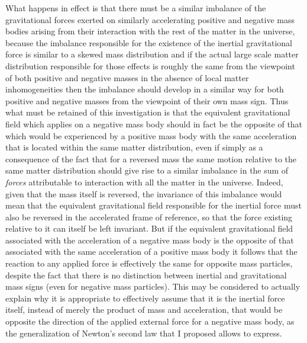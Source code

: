 \documentclass[notitlepage,12pt]{report}
\begin{document}
What happens in effect is that there must be a similar imbalance of the gravitational forces exerted on similarly accelerating positive and negative mass bodies arising from their interaction with the rest of the matter in the universe, because the imbalance responsible for the existence of the inertial gravitational force is similar to a skewed mass distribution and if the actual large scale matter distribution responsible for those effects is roughly the same from the viewpoint of both positive and negative masses in the absence of local matter inhomogeneities then the imbalance should develop in a similar way for both positive and negative masses from the viewpoint of their own mass sign. Thus what must be retained of this investigation is that the equivalent gravitational field which applies on a negative mass body should in fact be the opposite of that which would be experienced by a positive mass body with the same acceleration that is located within the same matter distribution, even if simply as a consequence of the fact that for a reversed mass the same motion relative to the same matter distribution should give rise to a similar imbalance in the sum of \textit{forces} attributable to interaction with all the matter in the universe. Indeed, given that the mass itself is reversed, the invariance of this imbalance would mean that the equivalent gravitational field responsible for the inertial force must also be reversed in the accelerated frame of reference, so that the force existing relative to it can itself be left invariant. But if the equivalent gravitational field associated with the acceleration of a negative mass body is the opposite of that associated with the same acceleration of a positive mass body it follows that the reaction to any applied force is effectively the same for opposite mass particles, despite the fact that there is no distinction between inertial and gravitational mass signs (even for negative mass particles). This may be considered to actually explain why it is appropriate to effectively assume that it is the inertial force itself, instead of merely the product of mass and acceleration, that would be opposite the direction of the applied external force for a negative mass body, as the generalization of Newton's second law that I proposed allows to express.
\end{document}
